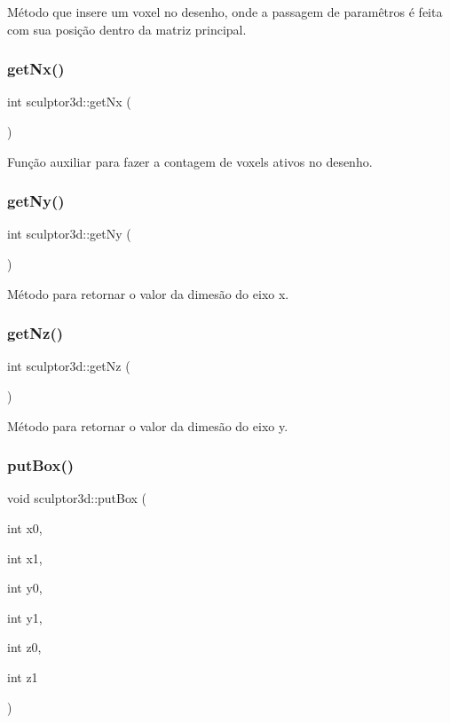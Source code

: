 Método que insere um voxel no desenho, onde a passagem de paramêtros é feita com sua posição dentro da matriz principal. \mbox{\label{classsculptor3d_a6f5974b59748b404ac44fef855dbf9ee}} 
\subsubsection{\texorpdfstring{get\+Nx()}{getNx()}}
{\footnotesize\ttfamily int sculptor3d\+::get\+Nx (\begin{DoxyParamCaption}{ }\end{DoxyParamCaption})}

Função auxiliar para fazer a contagem de voxels ativos no desenho. \mbox{\label{classsculptor3d_aa354fdd753a7567f782971893f63e05a}} 
\subsubsection{\texorpdfstring{get\+Ny()}{getNy()}}
{\footnotesize\ttfamily int sculptor3d\+::get\+Ny (\begin{DoxyParamCaption}{ }\end{DoxyParamCaption})}

Método para retornar o valor da dimesão do eixo x. \mbox{\label{classsculptor3d_ab393938c4dfdf621eb966d73b82bf705}} 
\subsubsection{\texorpdfstring{get\+Nz()}{getNz()}}
{\footnotesize\ttfamily int sculptor3d\+::get\+Nz (\begin{DoxyParamCaption}{ }\end{DoxyParamCaption})}

Método para retornar o valor da dimesão do eixo y. \mbox{\label{classsculptor3d_a33ad346684939cacea6c469afad99ffd}} 
\subsubsection{\texorpdfstring{put\+Box()}{putBox()}}
{\footnotesize\ttfamily void sculptor3d\+::put\+Box (\begin{DoxyParamCaption}\item[{int}]{x0,  }\item[{int}]{x1,  }\item[{int}]{y0,  }\item[{int}]{y1,  }\item[{int}]{z0,  }\item[{int}]{z1 }\end{DoxyParamCaption})}


